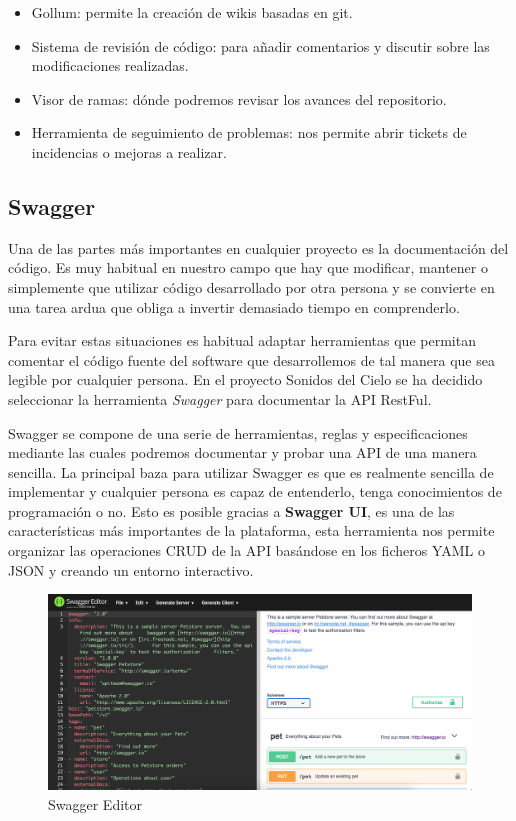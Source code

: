 \begin{itemize}
    \item Gollum: permite la creación de wikis basadas en git.
    \item Sistema de revisión de código: para añadir comentarios y discutir sobre las modificaciones realizadas.
    \item Visor de ramas: dónde podremos revisar los avances del repositorio.
    \item Herramienta de seguimiento de problemas: nos permite abrir tickets de incidencias o mejoras a realizar.
\end{itemize}


\subsection{Swagger}
Una de las partes más importantes en cualquier proyecto es la documentación del código. Es muy habitual en nuestro campo que hay que modificar, mantener o simplemente que utilizar código desarrollado por otra persona y se convierte en una tarea ardua que obliga a invertir demasiado tiempo en comprenderlo. 

Para evitar estas situaciones es habitual adaptar herramientas que permitan comentar el código fuente del software que desarrollemos de tal manera que sea legible por cualquier persona. En el proyecto Sonidos del Cielo se ha decidido seleccionar la herramienta \textit{Swagger}\cite{Swagger} para documentar la API RestFul. 

Swagger se compone de una serie de herramientas, reglas y especificaciones mediante las cuales podremos documentar y probar una API de una manera sencilla. La principal baza para utilizar Swagger es que es realmente sencilla de implementar y cualquier persona es capaz de entenderlo, tenga conocimientos de programación o no. Esto es posible gracias a \textbf{Swagger UI}, es una de las características más importantes de la plataforma, esta herramienta nos permite organizar las operaciones CRUD de la API basándose en los ficheros YAML o JSON y creando un entorno interactivo.

\begin{figure}[H]
    \centering
    \includegraphics[width=\textwidth]{include/capturas/SwaggerEditorOnline.png}
    \caption{Swagger Editor}
    \label{fig:swagger_online}
\end{figure}

